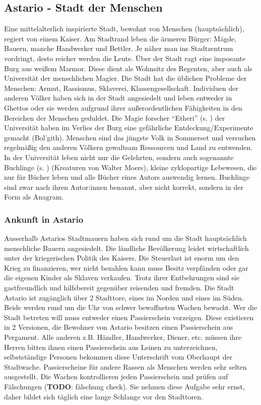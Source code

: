 \documentclass[11pt, twoside]{article}
\begin{document}
\subsection{Astario - Stadt der Menschen}
\label{sec:org66d0b06}
Eine mittelalterlich inspirierte Stadt, bewohnt von Menschen (hauptsächlich), regiert von einem Kaiser. Am Stadtrand leben die ärmeren Bürger: Mägde, Bauern, manche Handwerker und Bettler. Je näher man ins Stadtzentrum vordringt, desto reicher werden die Leute. Über der Stadt ragt eine imposante Burg aus weißem Marmor. Diese dient als Wohnsitz des Regenten, aber auch als Universität der menschlichen Magier. Die Stadt hat die üblichen Probleme der Menschen: Armut, Rassismus, Sklaverei, Klassengesellschaft. Individuen der anderen Völker haben sich in der Stadt angesiedelt und leben entweder in Ghettos oder sie werden aufgrund ihrer außerordentlichen Fähigkeiten in den Bereichen der Menschen geduldet. Die Magie forscher ``Etheri'' (s. \pageref{etheri}) der Universität haben im Verlies der Burg eine gefährliche Entdeckung/Experimente gemacht (Bol'gith). Menschen sind das jüngste Volk in Sommerset und versuchen regelmäßig den anderen Völkern gewaltsam Ressourcen und Land zu entwenden.
In der Universität leben nicht nur die Gelehrten, sondern auch sogenannte Buchlinge (s. \pageref{buchling}) (Kreaturen von Walter Moers), kleine zyklopartige Lebewesen, die nur für Bücher leben und alle Bücher eines Autors auswendig lernen.
Buchlinge sind zwar nach ihren Autor:innen benannt, aber nicht korrekt, sondern in der Form als Anagram.
\subsubsection{Ankunft in Astario}
\label{sec:orgbb2b2a3}
Ausserhalb Astarios Stadtmauern haben sich rund um die Stadt hauptsächlich menschliche Bauern angesiedelt.
Die ländliche Bevölkerung leidet wirtschaftlich unter der kriegerischen Politik des Kaisers.
Die Steuerlast ist enorm um den Krieg zu finanzieren, wer nicht bezahlen kann muss Besitz verpfänden oder gar die eigenen Kinder als Sklaven verkaufen.
Trotz ihrer Entbehrungen sind sie gastfreundlich und hilfsbereit gegenüber reisenden und fremden.
Die Stadt Astario ist zugänglich über 2 Stadttore, eines im Norden und eines im Süden. Beide werden rund um die Uhr von schwer bewaffneten Wachen bewacht. Wer die Stadt betreten will muss entweder einen Passierschein vorzeigen. Diese existieren in 2 Versionen, die Bewohner von Astario besitzen einen Passierschein aus Pergament. Alle anderen z.B. Händler, Handwerker, Diener, etc. müssen ihre Herren bitten ihnen einen Passierschein aus Leinen zu unterzeichnen, selbstständige Personen bekommen diese Unterschrift vom Oberhaupt der Stadtwache. Passierscheine für andere Rassen als Menschen werden sehr selten ausgestellt.
Die Wachen kontrollieren jeden Passierschein und prüfen auf Fälschungen (\textbf{TODO}: fälschung check). Sie nehmen diese Aufgabe sehr ernst, daher bildet sich täglich eine lange Schlange vor den Stadttoren.
\end{document}
